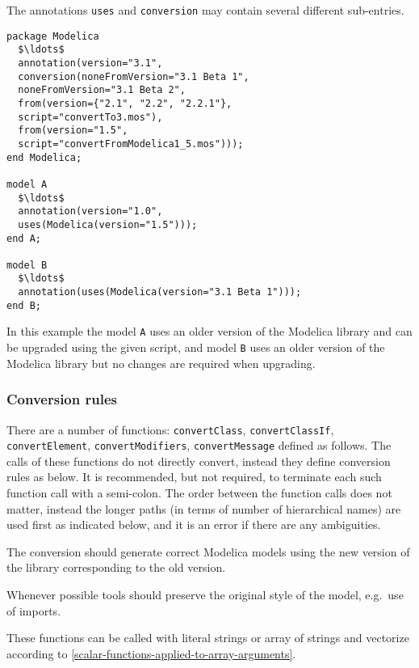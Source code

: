 The annotations \lstinline!uses! and \lstinline!conversion! may contain several different sub-entries.

\begin{example}
\begin{lstlisting}[language=modelica]
package Modelica
  $\ldots$
  annotation(version="3.1",
  conversion(noneFromVersion="3.1 Beta 1",
  noneFromVersion="3.1 Beta 2",
  from(version={"2.1", "2.2", "2.2.1"},
  script="convertTo3.mos"),
  from(version="1.5",
  script="convertFromModelica1_5.mos")));
end Modelica;

model A
  $\ldots$
  annotation(version="1.0",
  uses(Modelica(version="1.5")));
end A;

model B
  $\ldots$
  annotation(uses(Modelica(version="3.1 Beta 1")));
end B;
\end{lstlisting}
In this example the model \lstinline!A! uses an older version of the
Modelica library and can be upgraded using the given script, and model
\lstinline!B! uses an older version of the Modelica library but no changes are
required when upgrading.
\end{example}

\subsubsection{Conversion rules}\label{conversion-rules}

There are a number of functions: \lstinline!convertClass!, \lstinline!convertClassIf!,
\lstinline!convertElement!, \mbox{\lstinline!convertModifiers!,} \lstinline!convertMessage! defined as follows. The
calls of these functions do not directly convert, instead they define
conversion rules as below.
It is recommended, but not required, to terminate each such function call with a semi-colon.
The order between the function calls does not matter, instead the longer paths (in terms of number of hierarchical names)
are used first as indicated below, and it is an error if there are any
ambiguities.

The conversion should generate correct Modelica models using the new version of the library
corresponding to the old version.

\begin{nonnormative}
Whenever possible tools should preserve the original style of the model, e.g.\ use of imports.
\end{nonnormative}

These functions can be called with literal strings or array of strings
and vectorize according to \cref{scalar-functions-applied-to-array-arguments}.

